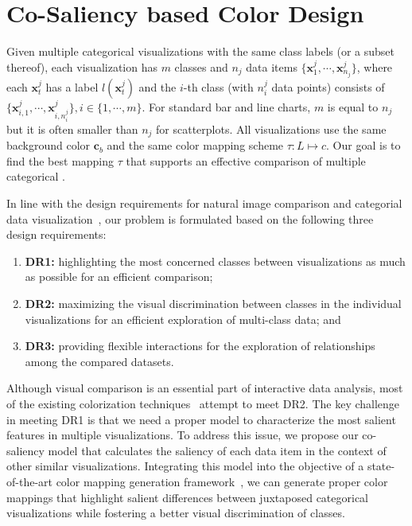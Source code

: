 \section{Co-Saliency based Color Design}
Given multiple categorical visualizations with the same class labels (or a subset thereof), each visualization has $m$ classes and $n_j$ data items $\{\mathbf{x}^j_1, \cdots, \mathbf{x}^j_{n_j}\}$, where each $\mathbf{x}^j_t$ has a label
$l(\mathbf{x}^j_t)$ and the $i$-th class (with $n^j_i$ data points) consists of $\{\mathbf{x}_{i,1}^j, \cdots , \mathbf{x}_{i,n^j_i}^j\}, i \in  \{ 1, \cdots, m \} $.
For standard bar and line charts, $m$ is equal to $n_j$ but it is often smaller than $n_j$ for scatterplots.
All visualizations use the same  background color $\mathbf{c}_b$ and the same color mapping scheme $\tau: L \mapsto c$. Our goal is to find the best mapping $\tau$ that supports an effective comparison of multiple categorical .

In line with the design requirements for natural image comparison and categorial data visualization~\cite{Jacobs10,Gleicher18,Lu21},
our problem is formulated based on the following three design requirements:
\begin{enumerate}[label=(\roman*),nosep]
\item \textbf{DR1:} highlighting the most concerned classes between visualizations as much as possible for an efficient comparison;
\item \textbf{DR2:} maximizing the visual discrimination between classes in the individual visualizations for an efficient exploration of multi-class data; and
\item \textbf{DR3:} providing flexible interactions for the exploration of relationships among the compared datasets.
\end{enumerate}
Although visual comparison is an essential part of interactive data analysis, most of  the existing  colorization techniques~\cite{Gramazio17, Lu21} attempt to meet DR2. The key challenge in meeting DR1 is that we need a proper model to characterize the most salient features in multiple visualizations.
To address this issue, we propose our %
co-saliency model that calculates the saliency of each data item in the context of other similar visualizations. Integrating this model into the objective of a state-of-the-art color mapping generation framework~\cite{Lu21}, we can
generate proper color mappings that highlight salient differences between juxtaposed categorical visualizations while fostering a better visual discrimination of classes.


